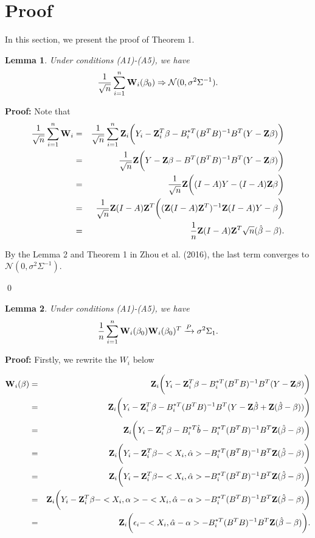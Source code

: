 \documentclass[preprint,12pt]{elsarticle}
\newtheorem{lemma}{Lemma}
\begin{document}
	
	\section{Proof}
	In this section, we present the proof of Theorem 1.
	
	\begin{lemma} Under conditions (A1)-(A5), we have
		\[\frac{1}{\sqrt{n}}\sum_{i=1}^n{\bf W}_i(\beta_0)\Rightarrow \mathcal{N}(0,\sigma^2\Sigma^{-1}).\]
	\end{lemma}
	
	{\bf Proof:} Note that
	\begin{eqnarray*}
	\frac{1}{\sqrt{n}}\sum_{i=1}^n{\bf W}_i&=&\frac{1}{\sqrt{n}}\sum_{i=1}^n{\bf Z}_i\bigg (Y_i-{\bf Z}_i^T\beta-B_i^{*T}(B^TB)^{-1}B^T(Y-{\bf Z}\beta)\bigg )\\
	&=&\frac{1}{\sqrt{n}}{\bf Z}\bigg (Y-{\bf Z}\beta-B^{T}(B^TB)^{-1}B^T(Y-{\bf Z}\beta)\bigg )\\
	&=&	\frac{1}{\sqrt{n}}{\bf Z}\bigg ((I-A)Y-(I-A){\bf Z}\beta\bigg )\\
	&=&\frac{1}{\sqrt{n}}{\bf Z}(I-A){\bf Z}^T\bigg(({\bf Z}(I-A){\bf Z}^T)^{-1}{\bf Z}(I-A)Y-\beta\bigg)\\
	&=&\frac{1}{n}{\bf Z}(I-A){\bf Z}^T\sqrt{n}(\hat{\beta}-\beta).
	\end{eqnarray*}

	By the Lemma 2 and Theorem 1 in Zhou et al. (2016), the last term converges to $\mathcal{N}(0,\sigma^2\Sigma^{-1})$. 

	\qed






	\begin{lemma}Under conditions (A1)-(A5), we have
	\[	\frac{1}{n}\sum_{i=1}^n{\bf W}_i(\beta_0){\bf W}_i(\beta_0)^T\xrightarrow{P} \sigma^2\Sigma_1.\]
	\end{lemma}
	
	
	
	
	{\bf Proof:} Firstly, we rewrite the $W_i$ below

	\begin{eqnarray*}
	{\bf W}_i(\beta)&=&{\bf Z}_i\bigg (Y_i-{\bf Z}_i^T\beta-B_i^{*T}(B^TB)^{-1}B^T(Y-{\bf Z}\beta)\bigg )\\
	&=&{\bf Z}_i\bigg (Y_i-{\bf Z}_i^T\beta-B_i^{*T}(B^TB)^{-1}B^T(Y-{\bf Z}\hat{\beta}+{\bf Z}(\hat{\beta}-\beta))\bigg )\\
	&=&{\bf Z}_i\bigg (Y_i-{\bf Z}_i^T\beta-B_i^{*T}\hat{b}-B_i^{*T}(B^TB)^{-1}B^T{\bf Z}(\hat{\beta}-\beta)\bigg )\\
	&=&{\bf Z}_i\bigg (Y_i-{\bf Z}_i^T\beta-<X_i,\hat{\alpha}>-B_i^{*T}(B^TB)^{-1}B^T{\bf Z}(\hat{\beta}-\beta)\bigg )\\
	&=&{\bf Z}_i\bigg (Y_i-{\bf Z}_i^T\beta-<X_i,\hat{\alpha}>-B_i^{*T}(B^TB)^{-1}B^T{\bf Z}(\hat{\beta}-\beta)\bigg )\\
	&=&{\bf Z}_i\bigg (Y_i-{\bf Z}_i^T\beta-<X_i,\alpha>-<X_i,\hat{\alpha}-\alpha>-B_i^{*T}(B^TB)^{-1}B^T{\bf Z}(\hat{\beta}-\beta)\bigg )\\
	&=&{\bf Z}_i\bigg (\epsilon_i-<X_i,\hat{\alpha}-\alpha>-B_i^{*T}(B^TB)^{-1}B^T{\bf Z}(\hat{\beta}-\beta)\bigg ).
	\end{eqnarray*}
\end{document}
